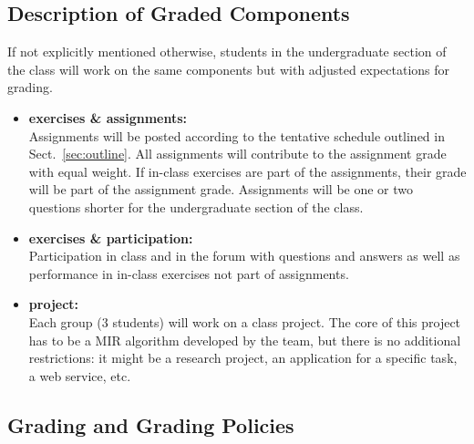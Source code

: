 \documentclass[letterpaper,oneside,10pt]{scrartcl}
\begin{document}
    \subsection{Description of Graded Components}
        If not explicitly mentioned otherwise, students in the undergraduate section of the class will work on the same components but with adjusted expectations for grading.
        \begin{itemize}
            \item   \textbf{exercises \& assignments: }\\
                Assignments will be posted according to the tentative schedule outlined in Sect.~\ref{sec:outline}. All assignments will contribute to the assignment grade with equal weight. If in-class exercises are part of the assignments, their grade will be part of the assignment grade. Assignments will be one or two questions shorter for the undergraduate section of the class.
            \item   \textbf{exercises \& participation:\\}
                Participation in class and in the forum with questions and answers as well as performance in in-class exercises not part of assignments. 
            \item   \textbf{project: }\\
                Each group (3 students) will work on a class project. The core of this project has to be a MIR algorithm developed by the team, but there is no additional restrictions: it might be a research project, an application for a specific task, a web service, etc. 
        \end{itemize}
    
    \subsection{Grading and Grading Policies}
         
\end{document}
